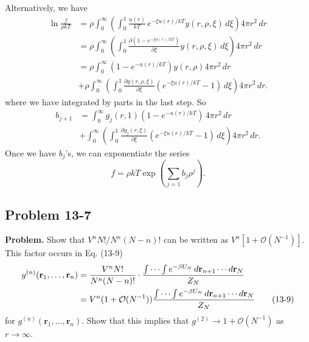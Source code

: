 \documentclass[twocolumn, 10pt]{article}
\numberwithin{equation}{section}
\newenvironment{problem}
{\par\medskip\sffamily \color{problue}
  \textbf{Problem. }\ignorespaces}
{\medskip}
\newenvironment{solution}[1][\empty]
{\par\medskip
  \textbf{\ifx\empty#1{Solution.}\relax\else{#1}\fi} \ignorespaces}
{\medskip}
\begin{document}
\begin{solution}
  Alternatively,
  we have
  \begin{align*}
    \ln \frac{ f } { \rho k T }
    &=
    \rho
    \int_0^\infty
    \left(
      \int_0^1
      \frac{u(r)} {kT} \, e^{-\xi u(r)/kT}
      y(r, \rho, \xi) \, d\xi \right)
     4 \pi r^2 \, dr
    \\
    &=
    \rho
    \int_0^\infty
    \left(
      \int_0^1
      \frac{ \partial (1 - e^{-\xi u(r)/kT}) } { \partial \xi }
      y(r, \rho, \xi) \, d\xi
    \right)
     4 \pi r^2 \, dr
    \\
    &=
    \rho
    \int_0^\infty
      (1 - e^{-u(r)/kT})
      y(r, \rho)
     4 \pi r^2 \, dr
    \\
    &+\rho
    \int_0^\infty
    \left(
      \int_0^1
      \frac{ \partial y(r, \rho, \xi) } { \partial \xi}
      (e^{-\xi u(r)/kT} - 1)
      \, d\xi \right)
     4 \pi r^2 \, dr
    .
  \end{align*}
  where we have integrated by parts in the last step.
  So
  \begin{align*}
    b_{j+1}
    &=
    \int_0^\infty
      g_j(r, 1) (1 - e^{-u(r)/kT})
      \, 4 \pi r^2 \, dr
    \\
    &+
    \int_0^\infty
      \left(
        \int_0^1 \frac{ \partial g_j(r, \xi) } { \partial \xi}
        (e^{-\xi u(r)/kT} - 1) \, d\xi
      \right)
    4 \pi r^2 \, dr
    .
  \end{align*}
  Once we have $b_j$'s, we can exponentiate the series
  $$
  f = \rho k T \exp\left( \sum_{j=1} b_j\rho^j \right).
  $$
\end{solution}


\subsection{Problem 13-7}

\begin{problem}
  Show that $V^n N! / N^n (N-n)!$
  can be written as $V^n[1 + \mathcal O(N^{-1})]$.
  This factor occurs in Eq. (13-9)
  \begin{align}
    g^{(n)}(\mathbf r_1, \dots, \mathbf r_n)
    &=
    \frac{ V^n N! } { N^n (N-n)! } \cdot
    \frac{
      \int\cdots\int e^{-\beta U_N} \, d\mathbf r_{n+1}\cdots d\mathbf r_N
    } { Z_N }
    \notag
    \\
    &=
    V^n(1 + \mathcal O(N^{-1}))
    \frac{
      \int\cdots\int e^{-\beta U_N} \, d\mathbf r_{n+1}\cdots d\mathbf r_N
    } { Z_N }
    \tag{13-9}
  \end{align}
  for $g^{(n)}(\mathbf r_1, \dots, \mathbf r_n)$.
  Show that this implies that
  $g^{(2)} \to 1 + \mathcal O(N^{-1})$ as $r \to \infty$.
\end{problem}
\end{document}
